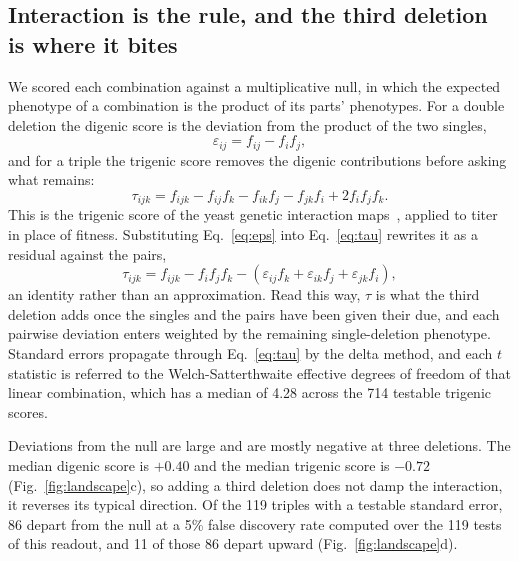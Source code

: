 \subsection*{Interaction is the rule, and the third deletion is where it bites}

We scored each combination against a multiplicative null, in which the expected phenotype of
a combination is the product of its parts' phenotypes. For a double deletion the digenic
score is the deviation from the product of the two singles,
%
\begin{equation}
\varepsilon_{ij} = f_{ij} - f_i f_j ,
\label{eq:eps}
\end{equation}
%
and for a triple the trigenic score removes the digenic contributions before asking what
remains:
%
\begin{equation}
\tau_{ijk} = f_{ijk} - f_{ij} f_k - f_{ik} f_j - f_{jk} f_i + 2 f_i f_j f_k .
\label{eq:tau}
\end{equation}
%
This is the trigenic score of the yeast genetic interaction
maps~\citep{kuzminSystematicAnalysisComplex2018,baryshnikovaQuantitativeAnalysisFitness2010},
applied to titer in place of fitness. Substituting Eq.~\ref{eq:eps} into
Eq.~\ref{eq:tau} rewrites it as a residual against the pairs,
%
\begin{equation}
\tau_{ijk} = f_{ijk} - f_i f_j f_k
- \left( \varepsilon_{ij} f_k + \varepsilon_{ik} f_j + \varepsilon_{jk} f_i \right) ,
\label{eq:tau-eps}
\end{equation}
%
an identity rather than an approximation. Read this way, $\tau$ is what the third deletion
adds once the singles and the pairs have been given their due, and each pairwise deviation
enters weighted by the remaining single-deletion phenotype. Standard errors propagate
through Eq.~\ref{eq:tau} by the delta method, and each $t$ statistic is referred to the
Welch-Satterthwaite effective degrees of freedom of that linear combination, which has a
median of 4.28 across the 714 testable trigenic scores.

Deviations from the null are large and are mostly negative at three deletions. The median
digenic score is $+0.40$ and the median trigenic score is $-0.72$
(Fig.~\ref{fig:landscape}c), so adding a third deletion does not damp the interaction, it
reverses its typical direction. Of the 119 triples with a testable standard error, 86 depart
from the null at a 5\% false discovery rate computed over the 119 tests of this readout, and
11 of those 86 depart upward (Fig.~\ref{fig:landscape}d).

